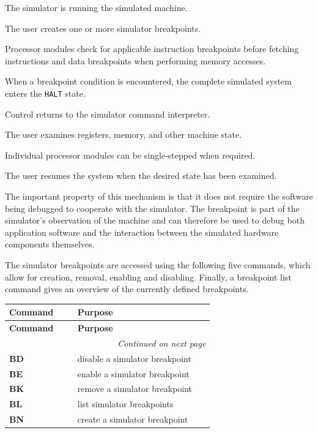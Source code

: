 \begin{smallGapItemize}
\item The simulator is running the simulated machine.
\item The user creates one or more simulator breakpoints.
\item Processor modules check for applicable instruction breakpoints before fetching instructions and data breakpoints when performing memory accesses.
\item When a breakpoint condition is encountered, the complete simulated system enters the \texttt{HALT} state.
\item Control returns to the simulator command interpreter.
\item The user examines registers, memory, and other machine state.
\item Individual processor modules can be single-stepped when required.
\item The user resumes the system when the desired state has been examined.
\end{smallGapItemize}

The important property of this mechanism is that it does not require the software being debugged to cooperate with the simulator. The breakpoint is part of the simulator’s observation of the machine and can therefore be used to debug both application software and the interaction between the simulated hardware components themselves.


The simulator breakpoints are accessed using the following five commands, which allow for creation, removal, enabling and disabling. Finally, a breakpoint list command gives an overview of the currently defined breakpoints.

\begin{longtable}{@{}p{0.3\linewidth}p{0.6\linewidth}@{}}
\toprule
\textbf{Command} & \textbf{Purpose} \\
\midrule
\endfirsthead
\toprule
\textbf{Command} & \textbf{Purpose} \\
\midrule
\endhead
\midrule
\multicolumn{2}{r}{\textit{Continued on next page}} \\
\midrule
\endfoot
\bottomrule
\endlastfoot
\textbf{BD} & disable a simulator breakpoint \\
\midrule
\textbf{BE} & enable a simulator breakpoint \\
\midrule
\textbf{BK} & remove a simulator breakpoint \\
\midrule
\textbf{BL} & list simulator breakpoints \\
\midrule
\textbf{BN} & create a simulator breakpoint \\
\end{longtable}


